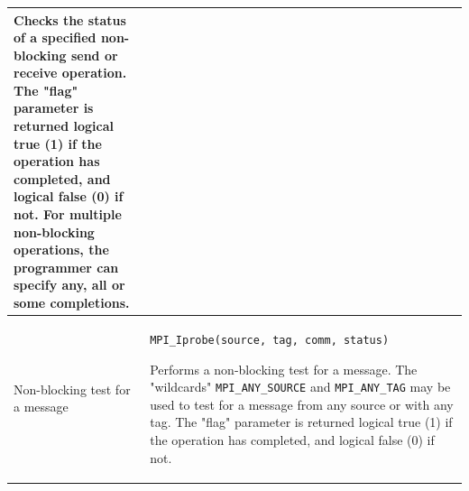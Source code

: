\begin{tabular}{|p{0.3\linewidth}|p{0.75\linewidth}|}
Checks the status of a specified non-blocking send or receive operation. The "flag" parameter is returned logical true (1) if the operation has completed, and logical false (0) if not. For multiple non-blocking operations, the programmer can specify any, all or some completions.   \\

\hline
Non-blocking test for a message &
\texttt{MPI\_Iprobe(source, tag, comm, status)}

Performs a non-blocking test for a message. The "wildcards" \texttt{MPI\_ANY\_SOURCE} and \texttt{MPI\_ANY\_TAG} may be used to test for a message from any source or with any tag. The "flag" parameter is returned logical true (1) if the operation has completed, and logical false (0) if not.  \\

\hline
\end{tabular}

